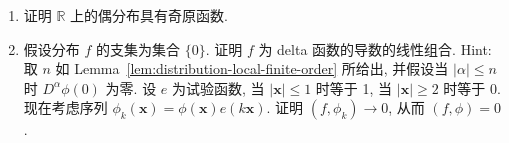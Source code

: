 \begin{enumerate}[label=\thesection.\arabic*.,ref=\thesection.\arabic*,start=20,series=book-problems]
\item\label{ex:even-distribution-odd-primitive} 证明 $\mathbb{R}$ 上的偶分布具有奇原函数.

\item\label{ex:point-supported-distribution-delta-derivatives} 假设分布 $f$ 的支集为集合 $\{0\}$. 证明 $f$ 为 delta 函数的导数的线性组合. Hint: 取 $n$ 如 Lemma~\ref{lem:distribution-local-finite-order} 所给出, 并假设当 $|\alpha|\leq n$ 时 $D^\alpha\phi(0)$ 为零. 设 $e$ 为试验函数, 当 $|\bm{x}|\leq1$ 时等于 1, 当 $|\bm{x}|\geq2$ 时等于 0. 现在考虑序列 $\phi_k(\bm{x})=\phi(\bm{x})e(k\bm{x})$. 证明 $(f,\phi_k)\to0$, 从而 $(f,\phi)=0$.

\end{enumerate}
